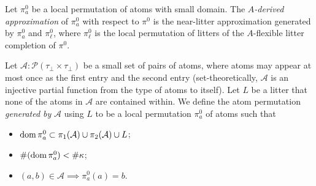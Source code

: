 \documentclass{article}
\begin{document}
\begin{definition}
    Let \( \pi^0_a \) be a local permutation of atoms with small domain.
    The \emph{\( A \)-derived approximation} of \( \pi^0_a \) with respect to \( \pi^0 \) is the near-litter approximation generated by \( \pi^0_a \) and \( \pi^0_\ell \), where \( \pi^0_\ell \) is the local permutation of litters of the \( A \)-flexible litter completion of \( \pi^0 \).
\end{definition}
\begin{definition}
    Let \( \mathcal A \colon \mathcal P (\tau_\bot \times \tau_\bot) \) be a small set of pairs of atoms, where atoms may appear at most once as the first entry and the second entry (set-theoretically, \( \mathcal A \) is an injective partial function from the type of atoms to itself).
    Let \( L \) be a litter that none of the atoms in \( \mathcal A \) are contained within.
    We define the atom permutation \emph{generated by} \( \mathcal A \) using \( L \) to be a local permutation \( \pi^0_a \) of atoms such that
    \begin{itemize}
        \item \( \operatorname{dom} \pi^0_a \subset \pi_1(\mathcal A) \cup \pi_2(\mathcal A) \cup L \);
        \item \( \#(\operatorname{dom} \pi^0_a) < \#\kappa \);
        \item \( (a, b) \in \mathcal A \implies \pi^0_a(a) = b \).
    \end{itemize}
\end{definition}
\end{document}
